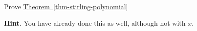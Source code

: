 \documentclass{book}
\begin{document}
\setcounter{cpjt}{287}
\addtocounter{cpjt}{-1}
\begin{activity}\label{activity-280}
\hypertarget{p-1450}{}%
Prove \hyperref[thm-stirling-polynomial]{Theorem~\ref{thm-stirling-polynomial}}%
\par\smallskip%
\noindent\textbf{Hint}.\hypertarget{hint-188}{}\quad%
\hypertarget{p-1451}{}%
You have already done this as well, although not with \(x\).%
\par\smallskip%
\noindent\end{activity}

\clearpage
\end{document}
